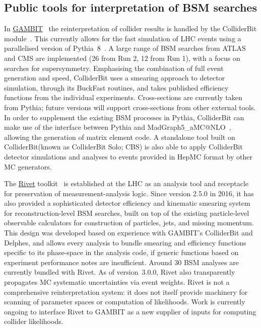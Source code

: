 \documentclass[a4paper,aps,prd,longbibliography,notitlepage,showpacs,amsmath,amssymb,superscriptaddress,nofootinbib,floatfix,11pt,preprintnumbers]{revtex4-1-mod}
\newcommand{\hepmc}{\textsf{HepMC}\xspace}
\newcommand{\gambit}{\textsf{GAMBIT}\xspace}
\newcommand{\rivet}{\textsf{Rivet}\xspace}
\newcommand{\colliderbit}{\textsf{ColliderBit}\xspace}
\newcommand{\delphes}{\textsf{Delphes}\xspace}
\newcommand{\BuckFast}{\textsf{BuckFast}\xspace}
\newcommand{\pythia}{\textsf{Pythia}\xspace}
\begin{document}
\subsection{Public tools for interpretation of BSM searches}


In \href{https://gambit.hepforge.org/}{\gambit}~\cite{gambit,grev} the reinterpretation of collider results is handled by the \colliderbit module~\cite{ColliderBit}. This currently allows for the fast simulation of LHC events using a parallelised version of \pythia~8~\cite{Sjostrand:2006za,Sjostrand:2014zea}.  A large range of BSM searches from ATLAS and CMS are implemented (26 from Run 2, 12 from Run 1), with a focus on searches for supersymmetry. Emphasising the combination of full event generation and speed, \colliderbit uses a smearing approach to detector simulation, through its \BuckFast routines, and takes published efficiency functions from the individual experiments. Cross-sections are currently taken from \pythia; future versions will support cross-sections from other external tools. In order to supplement the existing BSM processes in \pythia, \colliderbit can make use of the interface between \pythia and \textsf{MadGraph5\_aMC@NLO}~\cite{Alwall:2014bza}, allowing the generation of matrix element code.  A standalone tool built on \colliderbit (known as \textsf{ColliderBit Solo}; CBS) is also able to apply \colliderbit detector simulations and analyses to events provided in \hepmc format by other MC generators. %

The \href{https://rivet.hepforge.org/}{\rivet} toolkit~\cite{Buckley:2010ar,Bierlich:2019rhm} is established at the LHC as an analysis tool and receptacle for preservation of measurement-analysis logic. Since version 2.5.0 in 2016, it has also provided a sophisticated detector efficiency and kinematic smearing system for reconstruction-level BSM searches, built on top of the existing particle-level observable calculators for construction of particles, jets, and missing momentum. This design was developed based on experience with \gambit's \colliderbit and \delphes, and allows every analysis to bundle smearing and efficiency functions specific to its phase-space in the analysis code, if generic functions based on experiment performance notes are insufficient. Around 30 BSM analyses are currently bundled with \rivet. As of version~3.0.0, \rivet also transparently propagates MC systematic uncertainties via event weights. \rivet is not a comprehensive reinterpretation system: it does not itself provide machinery for scanning of parameter spaces or computation of likelihoods.
Work is currently ongoing to interface \rivet to \gambit as a new supplier of inputs for computing collider likelihoods.
\end{document}
